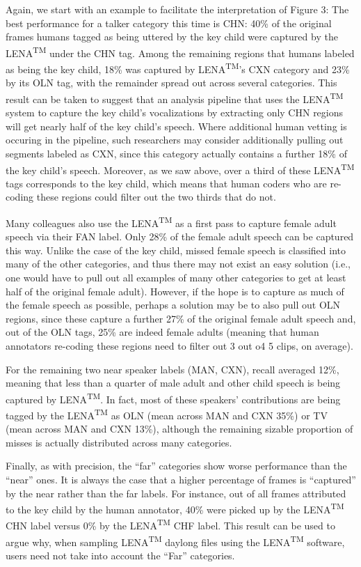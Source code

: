 \documentclass[english,floatsintext,man]{apa6}
\begin{document}
Again, we start with an example to facilitate the interpretation of
Figure 3: The best performance for a talker category this time is CHN:
40\% of the original frames humans tagged as being uttered by the key
child were captured by the LENA\textsuperscript{TM} under the CHN tag.
Among the remaining regions that humans labeled as being the key child,
18\% was captured by LENA\textsuperscript{TM}'s CXN category and 23\% by
its OLN tag, with the remainder spread out across several categories.
This result can be taken to suggest that an analysis pipeline that uses
the LENA\textsuperscript{TM} system to capture the key child's
vocalizations by extracting only CHN regions will get nearly half of the
key child's speech. Where additional human vetting is occuring in the
pipeline, such researchers may consider additionally pulling out
segments labeled as CXN, since this category actually contains a further
18\% of the key child's speech. Moreover, as we saw above, over a third
of these LENA\textsuperscript{TM} tags corresponds to the key child,
which means that human coders who are re-coding these regions could
filter out the two thirds that do not.

Many colleagues also use the LENA\textsuperscript{TM} as a first pass to
capture female adult speech via their FAN label. Only 28\% of the female
adult speech can be captured this way. Unlike the case of the key child,
missed female speech is classified into many of the other categories,
and thus there may not exist an easy solution (i.e., one would have to
pull out all examples of many other categories to get at least half of
the original female adult). However, if the hope is to capture as much
of the female speech as possible, perhaps a solution may be to also pull
out OLN regions, since these capture a further 27\% of the original
female adult speech and, out of the OLN tags, 25\% are indeed female
adults (meaning that human annotators re-coding these regions need to
filter out 3 out o4 5 clips, on average).

For the remaining two near speaker labels (MAN, CXN), recall averaged
12\%, meaning that less than a quarter of male adult and other child
speech is being captured by LENA\textsuperscript{TM}. In fact, most of
these speakers' contributions are being tagged by the
LENA\textsuperscript{TM} as OLN (mean across MAN and CXN 35\%) or TV
(mean across MAN and CXN 13\%), although the remaining sizable
proportion of misses is actually distributed across many categories.

Finally, as with precision, the \enquote{far} categories show worse
performance than the \enquote{near} ones. It is always the case that a
higher percentage of frames is \enquote{captured} by the near rather
than the far labels. For instance, out of all frames attributed to the
key child by the human annotator, 40\% were picked up by the
LENA\textsuperscript{TM} CHN label versus 0\% by the
LENA\textsuperscript{TM} CHF label. This result can be used to argue
why, when sampling LENA\textsuperscript{TM} daylong files using the
LENA\textsuperscript{TM} software, users need not take into account the
\enquote{Far} categories.
\end{document}

